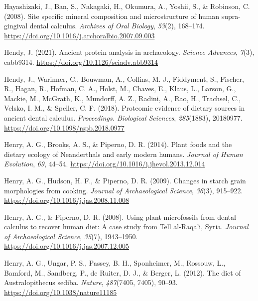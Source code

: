 \documentclass[
  letterpaper,
]{book}
\newlength{\cslhangindent}
\newlength{\cslentryspacingunit} %
\newenvironment{CSLReferences}[2] %
 {%
  \setlength{\parindent}{0pt}
  \ifodd #1
  \let\oldpar\par
  \def\par{\hangindent=\cslhangindent\oldpar}
  \fi
  \setlength{\parskip}{#2\cslentryspacingunit}
 }%
 {}
\begin{document}
\begin{CSLReferences}{1}{0}
\leavevmode{}%
Hayashizaki, J., Ban, S., Nakagaki, H., Okumura, A., Yoshii, S., \&
Robinson, C. (2008). Site specific mineral composition and
microstructure of human supra-gingival dental calculus. \emph{Archives
of Oral Biology}, \emph{53}(2), 168--174.
\url{https://doi.org/10.1016/j.archoralbio.2007.09.003}

\leavevmode{}%
Hendy, J. (2021). Ancient protein analysis in archaeology. \emph{Science
Advances}, \emph{7}(3), eabb9314.
\url{https://doi.org/10.1126/sciadv.abb9314}

\leavevmode{}%
Hendy, J., Warinner, C., Bouwman, A., Collins, M. J., Fiddyment, S.,
Fischer, R., Hagan, R., Hofman, C. A., Holst, M., Chaves, E., Klaus, L.,
Larson, G., Mackie, M., McGrath, K., Mundorff, A. Z., Radini, A., Rao,
H., Trachsel, C., Velsko, I. M., \& Speller, C. F. (2018). Proteomic
evidence of dietary sources in ancient dental calculus.
\emph{Proceedings. Biological Sciences}, \emph{285}(1883), 20180977.
\url{https://doi.org/10.1098/rspb.2018.0977}

\leavevmode{}%
Henry, A. G., Brooks, A. S., \& Piperno, D. R. (2014). Plant foods and
the dietary ecology of {Neanderthals} and early modern humans.
\emph{Journal of Human Evolution}, \emph{69}, 44--54.
\url{https://doi.org/10.1016/j.jhevol.2013.12.014}

\leavevmode{}%
Henry, A. G., Hudson, H. F., \& Piperno, D. R. (2009). Changes in starch
grain morphologies from cooking. \emph{Journal of Archaeological
Science}, \emph{36}(3), 915--922.
\url{https://doi.org/10.1016/j.jas.2008.11.008}

\leavevmode{}%
Henry, A. G., \& Piperno, D. R. (2008). Using plant microfossils from
dental calculus to recover human diet: A case study from {Tell}
al-{Raqā}'i, {Syria}. \emph{Journal of Archaeological Science},
\emph{35}(7), 1943--1950.
\url{https://doi.org/10.1016/j.jas.2007.12.005}

\leavevmode{}%
Henry, A. G., Ungar, P. S., Passey, B. H., Sponheimer, M., Rossouw, L.,
Bamford, M., Sandberg, P., de Ruiter, D. J., \& Berger, L. (2012). The
diet of {Australopithecus} sediba. \emph{Nature}, \emph{487}(7405,
7405), 90--93. \url{https://doi.org/10.1038/nature11185}


\end{CSLReferences}
\end{document}
